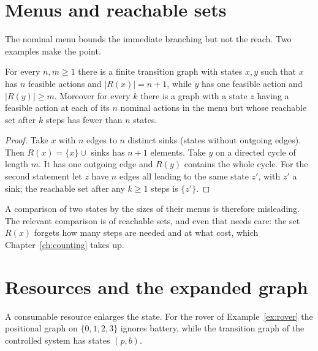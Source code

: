 \section{Menus and reachable sets}

The nominal menu bounds the immediate branching but not the reach. Two examples make the point.

\begin{newresult}\label{prop:menu}
For every $n,m\ge1$ there is a finite transition graph with states $x,y$ such that $x$ has $n$ feasible actions and $|R(x)|=n+1$, while $y$ has one feasible action and $|R(y)|\ge m$. Moreover for every $k$ there is a graph with a state $z$ having a feasible action at each of its $n$ nominal actions in the menu but whose reachable set after $k$ steps has fewer than $n$ states.
\end{newresult}
\begin{proof}
Take $x$ with $n$ edges to $n$ distinct sinks (states without outgoing edges). Then $R(x)=\{x\}\cup$ sinks has $n+1$ elements. Take $y$ on a directed cycle of length $m$. It has one outgoing edge and $R(y)$ contains the whole cycle. For the second statement let $z$ have $n$ edges all leading to the same state $z'$, with $z'$ a sink; the reachable set after any $k\ge1$ steps is $\{z'\}$.
\end{proof}

A comparison of two states by the sizes of their menus is therefore misleading. The relevant comparison is of reachable sets, and even that needs care: the set $R(x)$ forgets how many steps are needed and at what cost, which Chapter~\ref{ch:counting} takes up.

\section{Resources and the expanded graph}

A consumable resource enlarges the state. For the rover of Example~\ref{ex:rover} the positional graph on $\{0,1,2,3\}$ ignores battery, while the transition graph of the controlled system has states $(p,b)$.

